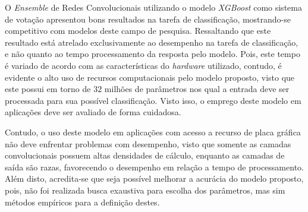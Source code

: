 O \textit{Ensemble} de Redes Convolucionais utilizando o modelo \textit{XGBoost} como sistema de votação apresentou bons resultados na tarefa de classificação, mostrando-se competitivo com modelos deste campo de pesquisa. Ressaltando que este resultado está atrelado exclusivamente ao desempenho na tarefa de classificação, e não quanto ao tempo processamento da resposta pelo modelo. Pois, este tempo é variado de acordo com as características do \textit{hardware} utilizado, contudo, é evidente o alto uso de recursos computacionais pelo modelo proposto, visto que este possui em torno de $32$ milhões de parâmetros nos qual a entrada deve ser processada para sua possível classificação. Visto isso, o emprego deste modelo em aplicações deve ser avaliado de forma cuidadosa.

Contudo, o uso deste modelo em aplicações com acesso a recurso de placa gráfica não deve enfrentar problemas com desempenho, visto que somente as camadas convolucionais possuem altas densidades de cálculo, enquanto as camadas de saída são razas, favorecendo o desempenho em relação a tempo de processamento. Além disto, acredita-se que seja possível melhorar a acurácia do modelo proposto, pois, não foi realizada busca exaustiva para escolha dos parâmetros, mas sim métodos empíricos para a definição destes.

